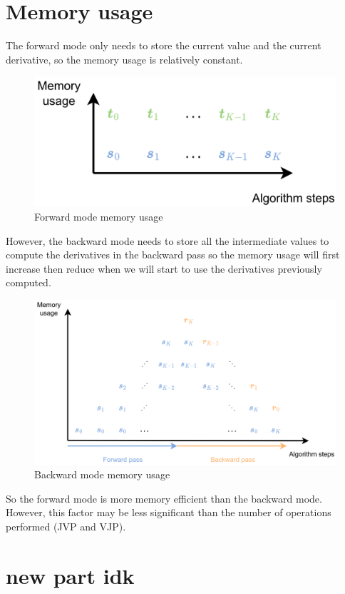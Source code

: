 \documentclass[12pt, openany]{report}
\theoremstyle{definition}
\begin{document}
\section{Memory usage}
The forward mode only needs to store the current value and the current derivative, so the memory usage is relatively constant.\\
\begin{figure}[H]
    \centering
    \includegraphics[width=\textwidth]{img/fd_mem.png}
    \caption{Forward mode memory usage}
    \label{fig:fd_mem}
\end{figure}
However, the backward mode needs to store all the intermediate values to compute the derivatives in the backward pass so the memory usage will first increase then reduce when we will start to use the derivatives previously computed.\\
\begin{figure}[H]
    \centering
    \includegraphics[width=\textwidth]{img/bd_mem.png}
    \caption{Backward mode memory usage}
    \label{fig:bd_mem}
\end{figure}
So the forward mode is more memory efficient than the backward mode. However, this factor may be less significant than the number of operations performed (JVP and VJP).
\section{new part idk}
\end{document}
